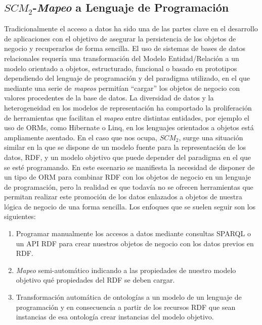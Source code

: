 \subsection{$SCM_2$-\textit{Mapeo} a Lenguaje de Programación}\label{scm2-consumo}
Tradicionalmente el acceso a datos ha sido una de las partes clave en el desarrollo de aplicaciones con el objetivo
de asegurar la persistencia de los objetos de negocio y recuperarlos de forma sencilla. El uso de sistemas de bases de datos relacionales
requería una transformación del Modelo Entidad/Relación a un modelo orientado a objetos, estructurado, funcional o basado
en prototipos dependiendo del lenguaje de programación y del paradigma utilizado, en el que mediante 
una serie de \textit{mapeos} permitían ``cargar'' los objetos de negocio con valores procedentes de la base de datos.
La diversidad de datos y la heterogeneidad en los modelos de representación ha comportado la proliferación 
de herramientas que facilitan el \textit{mapeo} entre distintas entidades, por ejemplo el uso de \gls{ORM}s, como Hibernate o Linq, en los lenguajes
orientados a objetos está ampliamente asentado. En el caso que nos ocupa, $SCM_2$, surge una situación similar en la que
se dispone de un modelo fuente para la representación de los datos, RDF, y un modelo objetivo que puede depender 
del paradigma en el que se esté programando. En este escenario se manifiesta la necesidad
de disponer de un tipo de \gls{ORM} para combinar \gls{RDF} con los objetos de negocio en un lenguaje de programación, pero 
la realidad es que todavía no se ofrecen herramientas que permitan realizar este promoción de los datos enlazados
a objetos de nuestra lógica de negocio de una forma sencilla. Los enfoques que se suelen seguir son los siguientes:

\begin{enumerate}
 \item Programar manualmente los accesos a datos mediante consultas \gls{SPARQL} o un \gls{API} RDF para crear
nuestros objetos de negocio con los datos previos en RDF.
\item \textit{Mapeo} semi-automático indicando a las propiedades de nuestro modelo objetivo qué \linebreak propiedades
del \dataset RDF se deben cargar.
\item Transformación automática de ontologías a un modelo de un lenguaje de programación y en consecuencia
a partir de los recursos RDF que sean instancias de esa ontología crear instancias del modelo objetivo.
\end{enumerate}

